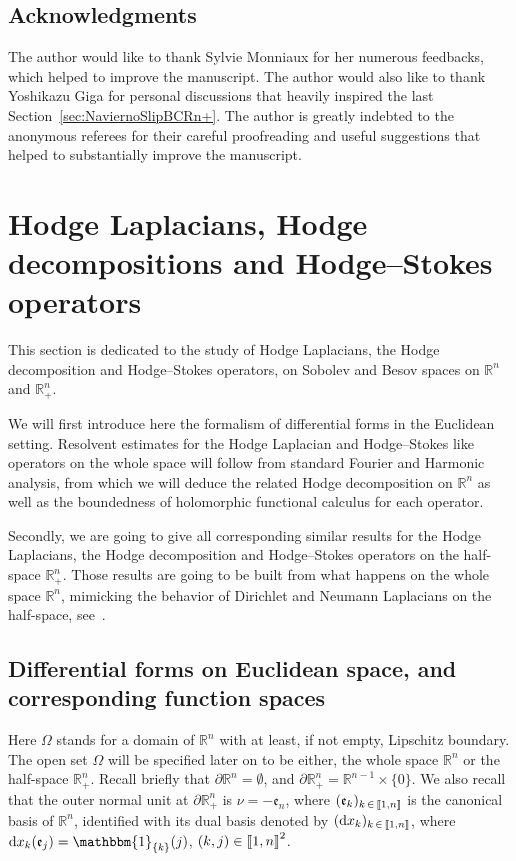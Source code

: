 \documentclass[10pt]{amsart}
\theoremstyle{definition}\newtheorem{defi}[theo]{Definition}\newtheorem{rema}[theo]{Remark}\newtheorem{exam}[theo]{Example}\newtheorem{exem}[theo]{Example}\newtheorem{nota}[theo]{Notation}
\newcommand{\bbR}{\mathbb{R}}
\newcommand{\rmd}{\mathrm{d}}
\newcommand{\fke}{\mathfrak{e}}
\newcommand{\llbracket}{\mathopen{[\mkern -2.7mu[}}
\newcommand{\rrbracket}{\mathclose{]\mkern -2.7mu]}}
\newcommand{\llb}{\llbracket}
\newcommand{\rrb}{\rrbracket}
\begin{document}
\subsection*{Acknowledgments}

The author would like to thank Sylvie Monniaux for her numerous feedbacks, which helped to improve the manuscript. The author would also like to thank Yoshikazu Giga for personal discussions that heavily inspired the last Section~\ref{sec:NaviernoSlipBCRn+}. The author is greatly indebted to the anonymous referees for their careful proofreading and useful suggestions that helped to substantially improve the manuscript.

\section{Hodge Laplacians, Hodge decompositions and Hodge--Stokes operators}

This section is dedicated to the study of Hodge Laplacians, the Hodge decomposition and Hodge--Stokes operators, on Sobolev and Besov spaces on $\bbR^n$ and $\bbR^n_+$.

We will first introduce here the formalism of differential forms in the Euclidean setting. Resolvent estimates for the Hodge Laplacian and Hodge--Stokes like operators on the whole space will follow from standard Fourier and Harmonic analysis, from which we will deduce the related Hodge decomposition on $\bbR^n$ as well as the boundedness of holomorphic functional calculus for each operator.

Secondly, we are going to give all corresponding similar results for the Hodge Laplacians, the Hodge decomposition and Hodge--Stokes operators on the half-space $\bbR^n_+$. Those results are going to be built from what happens on the whole space $\bbR^n$, mimicking the behavior of Dirichlet and Neumann Laplacians on the half-space, see~\cite[Section~5]{Gaudin2022}.



\subsection{Differential forms on Euclidean space, and corresponding function spaces}

Here $\Omega$ stands for a domain of $\bbR^n$ with at least, if not empty, Lipschitz boundary. The open set $\Omega$ will be specified later on to be either, the whole space $\bbR^n$ or the half-space $\bbR^n_+$. Recall briefly that $\partial\bbR^n = \emptyset$, and $\partial\bbR^n_+ = \bbR^{n-1}\times \{0\}$. We also recall that the outer normal unit at $\partial\bbR^n_+$ is ${\nu} = -\fke_n$, where $(\fke_k)_{k\,\in\,\llb 1, n\rrb}$ is the canonical basis of $\bbR^n$, identified with its dual basis denoted by $(\rmd x_{k})_{k\,\in\,\llb 1,n\rrb}$, where $\rmd x_{k}(\fke _j) = \mathbbm{1}_{\{k\}}(j)$, $(k,j)\in\llb 1,n\rrb^2$.
\end{document}

